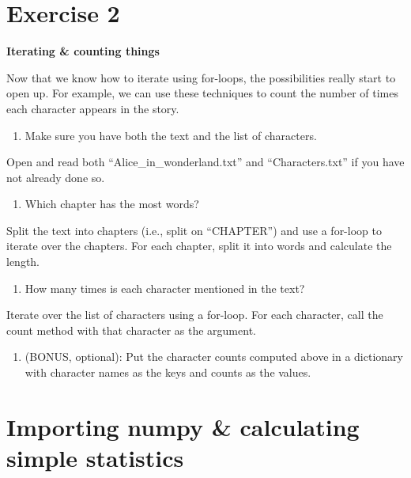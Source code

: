 \documentclass[]{book}
\providecommand{\tightlist}{%
  \setlength{\itemsep}{0pt}\setlength{\parskip}{0pt}}
\begin{document}
\hypertarget{exercise-2-3}{%
\section{Exercise 2}\label{exercise-2-3}}

\textbf{Iterating \& counting things}

Now that we know how to iterate using for-loops, the possibilities really start to open up. For example, we can use these techniques to count the number of times each character appears in the story.

\begin{enumerate}
\def\labelenumi{\arabic{enumi}.}
\tightlist
\item
  Make sure you have both the text and the list of characters.
\end{enumerate}

Open and read both ``Alice\_in\_wonderland.txt'' and
``Characters.txt'' if you have not already done so.

\begin{enumerate}
\def\labelenumi{\arabic{enumi}.}
\setcounter{enumi}{1}
\tightlist
\item
  Which chapter has the most words?
\end{enumerate}

Split the text into chapters (i.e., split on ``CHAPTER'') and use a for-loop to iterate over the chapters.
For each chapter, split it into words and calculate the length.

\begin{enumerate}
\def\labelenumi{\arabic{enumi}.}
\setcounter{enumi}{2}
\tightlist
\item
  How many times is each character mentioned in the text?
\end{enumerate}

Iterate over the list of characters using a for-loop.
For each character, call the count method with that character as the argument.

\begin{enumerate}
\def\labelenumi{\arabic{enumi}.}
\setcounter{enumi}{3}
\tightlist
\item
  (BONUS, optional): Put the character counts computed
  above in a dictionary with character names as the keys and
  counts as the values.
\end{enumerate}

\hypertarget{importing-numpy-calculating-simple-statistics}{%
\section{Importing numpy \& calculating simple statistics}\label{importing-numpy-calculating-simple-statistics}}
\end{document}
